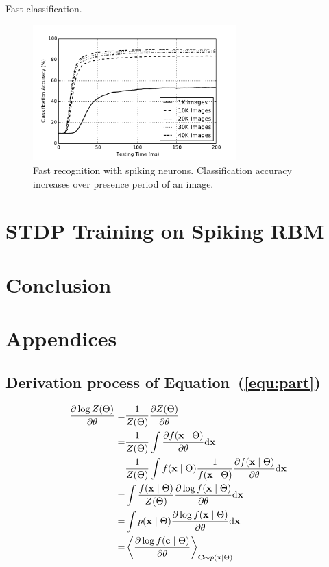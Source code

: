 	Fast classification.
	\begin{figure}
		\centering
		\includegraphics[width=0.7\textwidth]{pics_ae/recog_speed.pdf}
		\caption{Fast recognition with spiking neurons. Classification accuracy increases over presence period of an image.}
		\label{fig:recog_speed}		
	\end{figure}
	
	
	
\section{STDP Training on Spiking RBM}	

\section{Conclusion}

	
\section{Appendices}
		\subsection{Derivation process of Equation~(\ref{equ:part})}
		\label{app:part}
		\begin{equation}
		\begin{aligned}
		\dfrac{\partial \log Z(\Theta)}{\partial \theta}
		=&\frac{1}{Z(\Theta)}\dfrac{\partial Z(\Theta)}{\partial \theta}\\
		=&\frac{1}{Z(\Theta)} \int \dfrac{\partial f(\mathbf{x} \mid \Theta)}{\partial \theta} \mathrm{d} \mathbf{x} \\
		=&\frac{1}{Z(\Theta)} \int f(\mathbf{x} \mid \Theta) \frac{1}{f(\mathbf{x} \mid \Theta)} \dfrac{\partial  f(\mathbf{x} \mid \Theta)}{\partial \theta} \mathrm{d} \mathbf{x}\\
		=& \int \frac{f(\mathbf{x} \mid \Theta) }{Z(\Theta)} \dfrac{\partial \log f(\mathbf{x} \mid \Theta)}{\partial \theta} \mathrm{d} \mathbf{x}\\
		=& \int  p(\mathbf{x} \mid \Theta) \dfrac{\partial \log f(\mathbf{x} \mid \Theta)}{\partial \theta} \mathrm{d} \mathbf{x}\\
		=&\left \langle \dfrac{\partial \log f(\mathbf{c} \mid \Theta)}{\partial \theta}\right \rangle_{\mathbf{C} \sim p(\mathbf{x} \mid \Theta)}
		\end{aligned}
		\end{equation}
